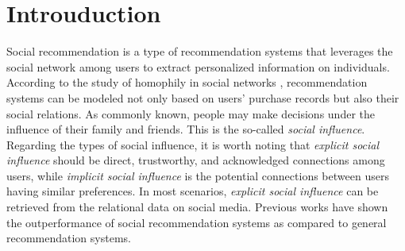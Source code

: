 \documentclass[letterpaper]{article} %
\begin{document}
\section{Introuduction}
Social recommendation is a type of recommendation systems that leverages the social network among users to extract personalized information on individuals. According to the study of homophily in social networks \cite{birds_of_feather, dual_graph}, recommendation systems can be modeled not only based on users' purchase records but also their social relations. As commonly known, people may make decisions under the influence of their family and friends. This is the so-called \textit{social influence}. Regarding the types of social influence, it is worth noting that \textit{explicit social influence} should be direct, trustworthy, and acknowledged connections among users, while \textit{implicit social influence} is the potential connections between users having similar preferences. In most scenarios, \textit{explicit social influence} can be retrieved from the relational data on social media. Previous works \cite{sorec, socialmf, trustsvd} have shown the outperformance of social recommendation systems as compared to general recommendation systems.
\end{document}
